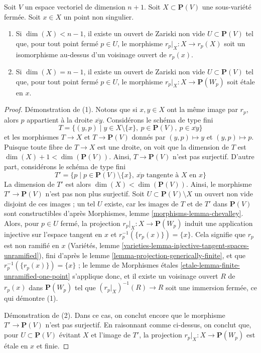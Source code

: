 \begin{lemma}
\label{lemma-projection-generically-immersion}
Soit $V$ un espace vectoriel de dimension $n + 1$.
Soit $X \subset \mathbf{P}(V)$ une sous-variété fermée.
Soit $x \in X$ un point non singulier.
\begin{enumerate}
\item Si $\dim(X) < n - 1$, il existe un ouvert de Zariski non vide
$U \subset \mathbf{P}(V)$ tel que, pour tout point fermé $p \in U$, le
morphisme $r_p|_X : X \to r_p(X)$ soit un
isomorphisme au-dessus d'un voisinage ouvert de $r_p(x)$.
\item Si $\dim(X) = n - 1$, il existe un ouvert de Zariski non vide
$U \subset \mathbf{P}(V)$ tel que, pour tout point fermé $p \in U$, le
morphisme $r_p|_X : X \to \mathbf{P}(W_p)$ soit \'etale en $x$.
\end{enumerate}
\end{lemma}

\begin{proof}
Démonstration de (1). Notons que si $x, y \in X$ ont la même image par
$r_p$, alors $p$ appartient à la droite $\overline{xy}$.
Considérons le schéma de type fini
$$
T = \{(y, p) \mid
y \in X \setminus \{x\},\ p \in \mathbf{P}(V),\ p \in \overline{xy}\}
$$
et les morphismes $T \to X$ et $T \to \mathbf{P}(V)$ donnés par
$(y, p) \mapsto y$ et $(y, p) \mapsto p$.
Puisque toute fibre de $T \to X$ est une droite, on voit que
la dimension de $T$ est $\dim(X) + 1 < \dim(\mathbf{P}(V))$.
Ainsi, $T \to \mathbf{P}(V)$ n'est pas surjectif. D'autre part,
considérons le schéma de type fini
$$
T' = \{p \mid
p \in \mathbf{P}(V) \setminus \{x\},
\ \overline{xp}\text{ tangente à }X\text{ en }x\}
$$
La dimension de $T'$ est alors $\dim(X) < \dim(\mathbf{P}(V))$.
Ainsi, le morphisme $T' \to \mathbf{P}(V)$ n'est pas non plus surjectif.
Soit $U \subset \mathbf{P}(V) \setminus X$ un ouvert non vide disjoint
de ces images ; un tel $U$ existe, car les images de $T$ et de $T'$
dans $\mathbf{P}(V)$ sont constructibles d'après
Morphismes, lemme \ref{morphisms-lemma-chevalley}.
Alors, pour $p \in U$ fermé, la projection
$r_p|_X : X \to \mathbf{P}(W_p)$ induit une application injective sur
l'espace tangent en $x$ et $r_p^{-1}(\{r_p(x)\}) = \{x\}$.
Cela signifie que $r_p$ est non ramifié en $x$
(Variétés, lemme \ref{varieties-lemma-injective-tangent-spaces-unramified}),
fini d'après le lemme \ref{lemma-projection-generically-finite},
et que $r_p^{-1}(\{r_p(x)\}) = \{x\}$ ; le lemme de Morphismes \'etales
\ref{etale-lemma-finite-unramified-one-point} s'applique donc, et
il existe un voisinage ouvert $R$ de $r_p(x)$
dans $\mathbf{P}(W_p)$ tel que $(r_p|_X)^{-1}(R) \to R$ soit une
immersion fermée, ce qui démontre (1).

\medskip\noindent
Démonstration de (2). Dans ce cas, on conclut encore que le morphisme
$T' \to \mathbf{P}(V)$ n'est pas surjectif.
En raisonnant comme ci-dessus, on conclut que, pour $U \subset \mathbf{P}(V)$
évitant $X$ et l'image de $T'$, la projection
$r_p|_X : X \to \mathbf{P}(W_p)$ est \'etale en $x$ et finie.
\end{proof}


